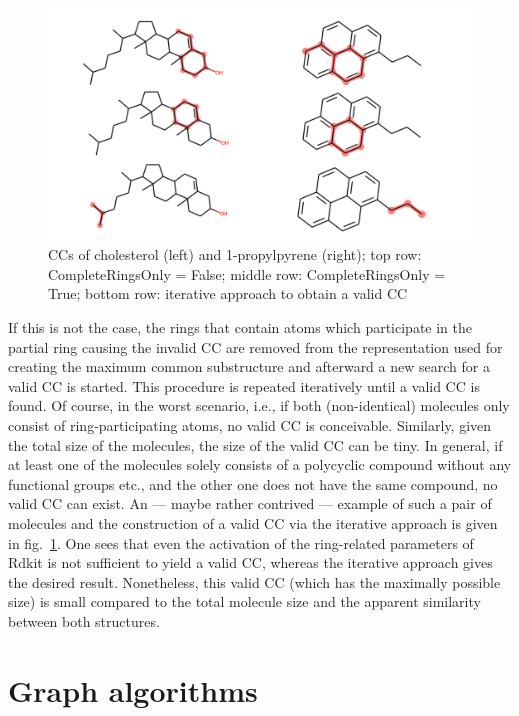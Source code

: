 \begin{figure}
	\includegraphics[scale=0.6]{cholesterol_pryenepropanoic_acid.png}
	
	\caption{CCs of cholesterol (left) and 1-propylpyrene (right); top row: CompleteRingsOnly = False; middle row: CompleteRingsOnly = True; bottom row: iterative approach to obtain a valid {\trafo} CC}
	\label{fig:pyrene}
\end{figure}

If this is not the case, the rings that contain atoms which participate in the partial ring causing the invalid CC are removed from the representation used for creating the maximum common substructure and afterward a new search for a valid CC is started. This procedure is repeated iteratively until a valid CC is found.
Of course, in the worst scenario, i.e., if both (non-identical) molecules only consist of ring-participating atoms, no valid CC is conceivable. Similarly, given the total size of the molecules, the size of the valid CC can be tiny. In general, if at least one of the molecules solely consists of a polycyclic compound without any functional groups etc., and the other one does not have the same compound, no valid CC can exist. 
An --- maybe rather contrived --- example of such a pair of molecules and the construction of a valid CC via the iterative approach is given in fig.~\ref{fig:pyrene}. One sees that even the activation of the ring-related parameters of Rdkit is not sufficient to yield a valid CC, whereas the iterative approach gives the desired result. Nonetheless, this valid CC (which has the maximally possible size) is small compared to the total molecule size and the apparent similarity between both structures.



\section{Graph algorithms}

